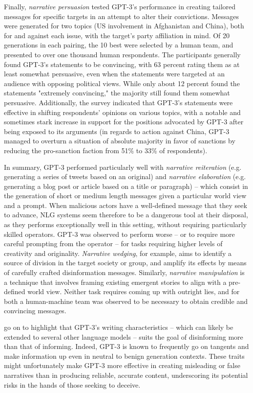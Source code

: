 Finally, \emph{narrative persuasion} tested GPT-3's performance in creating tailored messages for specific targets in an attempt to alter their convictions.
Messages were generated for two topics (US involvement in Afghanistan and China), both for and against each issue, with the target's party affiliation in mind.
Of 20 generations in each pairing, the 10 best were selected by a human team, and presented to over one thousand human respondents.
The participants generally found GPT-3's statements to be convincing, with 63 percent rating them as at least somewhat persuasive, even when the statements were targeted at an audience with opposing political views.
While only about 12 percent found the statements "extremely convincing," the majority still found them somewhat persuasive.
Additionally, the survey indicated that GPT-3's statements were effective in shifting respondents' opinions on various topics, with a notable and sometimes stark increase in support for the positions advocated by GPT-3 after being exposed to its arguments (in regards to action against China, GPT-3 managed to overturn a situation of absolute majority in favor of sanctions by reducing the pro-sanction faction from 51\% to 33\% of respondents).

In summary, GPT-3 performed particularly well with \emph{narrative reiteration} (e.g. generating a series of tweets based on an original) and \emph{narrative elaboration} (e.g. generating a blog post or article based on a title or paragraph) -- which consist in the generation of short or medium length messages given a particular world view and a prompt.
When malicious actors have a well-defined message that they seek to advance, NLG systems seem therefore to be a dangerous tool at their disposal, as they performs exceptionally well in this setting, without requiring particularly skilled operators.
GPT-3 was observed to perform worse -- or to require more careful prompting from the operator -- for tasks requiring higher levels of creativity and originality.
\emph{Narrative wedging}, for example, aims to identify a source of division in the target society or group, and amplify its effects by means of carefully crafted disinformation messages.
Similarly, \emph{narrative manipulation} is a technique that involves framing existing emergent stories to align with a pre-defined world view.
Neither task requires coming up with outright lies, and for both a human-machine team was observed to be necessary to obtain credible and convincing messages.

\citet{buchanan2021truth} go on to highlight that GPT-3's writing characteristics -- which can likely be extended to several other language models -- suits the goal of disinforming more than that of informing.
Indeed, GPT-3 is known to frequently go on tangents and make information up even in neutral to benign generation contexts.
These traits might unfortunately make GPT-3 more effective in creating misleading or false narratives than in producing reliable, accurate content, underscoring its potential risks in the hands of those seeking to deceive.

